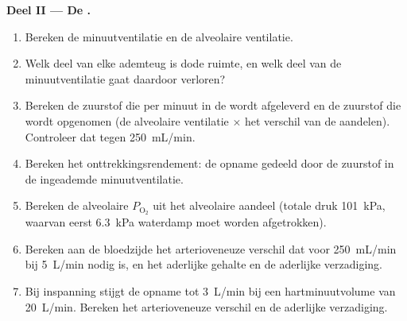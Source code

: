 \begin{problem}
\medskip
\noindent\textbf{Deel II --- De .}
\begin{enumerate}[resume]
  \item Bereken de minuutventilatie en de alveolaire ventilatie.
  \item Welk deel van elke ademteug is dode ruimte, en welk deel van de
        minuutventilatie gaat daardoor verloren?
  \item Bereken de zuurstof die per minuut in de  wordt
        afgeleverd en de zuurstof die wordt opgenomen (de alveolaire
        ventilatie $\times$ het verschil van de aandelen). Controleer dat
        tegen \qty{250}{mL/min}.
  \item Bereken het onttrekkingsrendement: de opname gedeeld door de
        zuurstof in de ingeademde minuutventilatie.
  \item Bereken de alveolaire $P_{\mathrm{O_2}}$ uit het alveolaire
        aandeel (totale druk \qty{101}{kPa}, waarvan eerst \qty{6.3}{kPa}
        waterdamp moet worden afgetrokken).
  \item Bereken aan de bloedzijde het arterioveneuze verschil dat voor
        \qty{250}{mL/min} bij \qty{5}{L/min} nodig is, en het aderlijke
        gehalte en de aderlijke verzadiging.
  \item Bij inspanning stijgt de opname tot \qty{3}{L/min} bij een
        hartminuutvolume van \qty{20}{L/min}. Bereken het arterioveneuze
        verschil en de aderlijke verzadiging.
\end{enumerate}


\end{problem}
